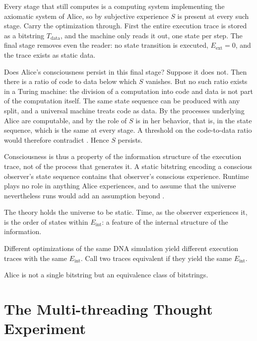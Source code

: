 \documentclass[11pt]{book}
\begin{document}
Every stage that still computes is a computing system implementing the
axiomatic system of Alice, so by  subjective
experience $S$ is present at every such stage. Carry the optimization
through. First the entire execution trace is stored as a bitstring
$T_{\mathrm{data}}$, and the machine only reads it out, one state per step.
The final stage removes even the reader: no state transition is executed,
$E_{\mathrm{ext}} = 0$, and the trace exists as static data.

Does Alice's consciousness persist in this final stage? Suppose it does
not. Then there is a ratio of code to data below which $S$ vanishes.
But no such ratio exists in a Turing machine: the division of a
computation into code and data is not part of the computation itself. The
same state sequence can be produced with any split, and a universal machine
treats code as data. By  the processes underlying
Alice are computable, and by  the role of $S$ is in her
behavior, that is, in the state sequence, which is the same at every stage.
A threshold on the code-to-data ratio would therefore contradict
. Hence $S$ persists.

Consciousness is thus a property of the information structure of the
execution trace, not of the process that generates it. A static bitstring
encoding a conscious observer's state sequence contains that observer's
conscious experience. Runtime plays no role in anything Alice experiences,
and to assume that the universe nevertheless runs would add an assumption
beyond \AssumptionSet.

\begin{deduction}\label{ded:static}
  The theory holds the universe to be static. Time, as the observer
  experiences it, is the order of states within $E_{\mathrm{int}}$: a
  feature of the internal structure of the information.
\end{deduction}

Different optimizations of the same DNA simulation yield different
execution traces with the same $E_{\mathrm{int}}$. Call two traces
equivalent if they yield the same $E_{\mathrm{int}}$.

\begin{deduction}\label{ded:equivalence}
  Alice is not a single bitstring but an equivalence class of bitstrings.
\end{deduction}


\section{The Multi-threading Thought Experiment}
\label{sec:multithreading}
\end{document}
